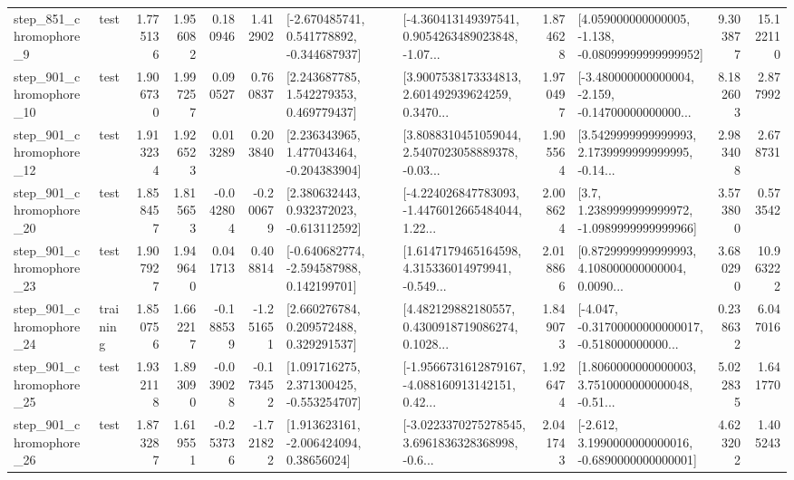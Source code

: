 \begin{tabular}{llrrrrllrlrr}
   step\_851\_chromophore\_9 &      test &      1.775136 &    1.956082 &      0.180946 &  1.412902 &   [-2.670485741, 0.541778892, -0.344687937] &  [-4.360413149397541, 0.9054263489023848, -1.07... &       1.874628 &  [4.059000000000005, -1.138, -0.08099999999999952] &            9.303877 &         15.122110 \\
  step\_901\_chromophore\_10 &      test &      1.906730 &    1.997257 &      0.090527 &  0.760837 &     [2.243687785, 1.542279353, 0.469779437] &  [3.9007538173334813, 2.601492939624259, 0.3470... &       1.970497 &  [-3.480000000000004, -2.159, -0.14700000000000... &            8.182603 &          2.877992 \\
  step\_901\_chromophore\_12 &      test &      1.913234 &    1.926523 &      0.013289 &  0.203840 &    [2.236343965, 1.477043464, -0.204383904] &  [3.8088310451059044, 2.5407023058889378, -0.03... &       1.905564 &  [3.5429999999999993, 2.1739999999999995, -0.14... &            2.983408 &          2.678731 \\
  step\_901\_chromophore\_20 &      test &      1.858457 &    1.815653 &     -0.042804 & -0.200679 &    [2.380632443, 0.932372023, -0.613112592] &  [-4.224026847783093, -1.4476012665484044, 1.22... &       2.008624 &     [3.7, 1.2389999999999972, -1.0989999999999966] &            3.573800 &          0.573542 \\
  step\_901\_chromophore\_23 &      test &      1.907927 &    1.949640 &      0.041713 &  0.408814 &   [-0.640682774, -2.594587988, 0.142199701] &  [1.6147179465164598, 4.315336014979941, -0.549... &       2.018866 &  [0.8729999999999993, 4.108000000000004, 0.0090... &            3.680290 &         10.963222 \\
  step\_901\_chromophore\_24 &  training &      1.850756 &    1.662217 &     -0.188539 & -1.251651 &     [2.660276784, 0.209572488, 0.329291537] &  [4.482129882180557, 0.4300918719086274, 0.1028... &       1.849073 &  [-4.047, -0.31700000000000017, -0.518000000000... &            0.238632 &          6.047016 \\
  step\_901\_chromophore\_25 &      test &      1.932118 &    1.893090 &     -0.039028 & -0.173452 &    [1.091716275, 2.371300425, -0.553254707] &  [-1.9566731612879167, -4.088160913142151, 0.42... &       1.926474 &  [1.8060000000000003, 3.7510000000000048, -0.51... &            5.022835 &          1.641770 \\
  step\_901\_chromophore\_26 &      test &      1.873287 &    1.619551 &     -0.253736 & -1.721822 &     [1.913623161, -2.006424094, 0.38656024] &  [-3.0223370275278545, 3.6961836328368998, -0.6... &       2.041743 &  [-2.612, 3.1990000000000016, -0.6890000000000001] &            4.623202 &          1.405243 \\

\end{tabular}
